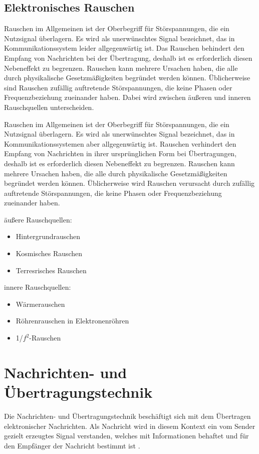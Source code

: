 \subsection{Elektronisches Rauschen}

Rauschen im Allgemeinen ist der Oberbegriff für Störspannungen, die ein Nutzsignal überlagern. Es wird als unerwünschtes Signal bezeichnet, das in Kommunikationssystem leider allgegenwärtig ist. Das Rauschen behindert den Empfang von Nachrichten bei der Übertragung, deshalb ist es erforderlich diesen Nebeneffekt zu begrenzen. Rauschen kann mehrere Ursachen haben, die alle durch physikalische Gesetzmäßigkeiten begründet werden können. Üblicherweise sind  Rauschen zufällig auftretende Störspannungen, die keine  Phasen oder Frequenzbeziehung zueinander haben. Dabei wird zwischen äußeren und inneren Rauschquellen unterscheiden.\newline

Rauschen im Allgemeinen ist der Oberbegriff für Störspannungen, die ein Nutzsignal überlagern. Es wird als unerwünschtes Signal bezeichnet, das in Kommunikationssystemen aber allgegenwärtig ist. Rauschen verhindert den Empfang von Nachrichten in ihrer ursprünglichen Form bei Übertragungen, deshalb ist es erforderlich diesen Nebeneffekt zu begrenzen. Rauschen kann mehrere Ursachen haben, die alle durch physikalische Gesetzmäßigkeiten begründet werden können. Üblicherweise wird Rauschen verursacht durch zufällig auftretende Störspannungen, die keine  Phasen oder Frequenzbeziehung zueinander haben.


äußere Rauschquellen: 
\begin{itemize}
	\item Hintergrundrauschen
	\item Kosmisches Rauschen
	\item Terresrisches Rauschen
\end{itemize}
innere Rauschquellen:
\begin{itemize}
	\item Wärmerauschen
	\item Röhrenrauschen in Elektronenröhren
	\item 1/$f^2$-Rauschen
\end{itemize}

\newpage
\section{Nachrichten- und Übertragungstechnik}
Die Nachrichten- und Übertragungstechnik beschäftigt sich mit dem Übertragen elektronischer Nachrichten. Als Nachricht wird in diesem Kontext ein vom Sender gezielt erzeugtes Signal verstanden, welches mit Informationen behaftet und für den Empfänger der Nachricht bestimmt ist \cite[vgl. Werner, S. 3]{Werner:2006}.

